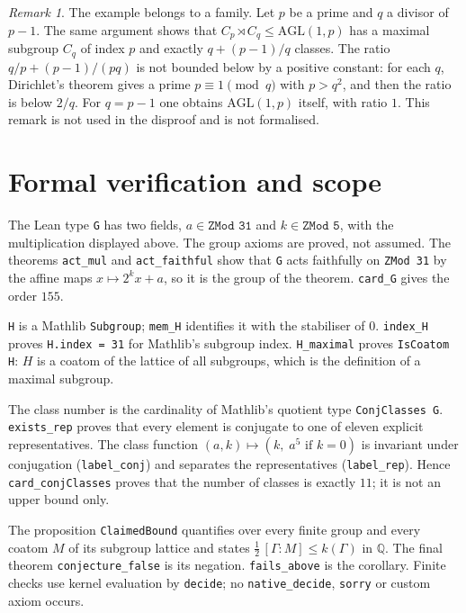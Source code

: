 \documentclass[11pt]{article}
\theoremstyle{remark}
\newtheorem*{remark}{Remark}
\begin{document}
\begin{remark}
The example belongs to a family. Let $p$ be a prime and $q$ a divisor of
$p-1$. The same argument shows that $C_p\rtimes C_q\le
\mathrm{AGL}(1,p)$ has a maximal subgroup $C_q$ of index $p$ and
exactly $q+(p-1)/q$ classes. The ratio $q/p+(p-1)/(pq)$ is not bounded
below by a positive constant: for each $q$, Dirichlet's theorem gives a
prime $p\equiv1\pmod q$ with $p>q^2$, and then the ratio is below $2/q$.
For $q=p-1$ one obtains $\mathrm{AGL}(1,p)$ itself, with ratio $1$. This
remark is not used in the disproof and is not formalised.
\end{remark}

\section*{Formal verification and scope}
The Lean type \texttt{G} has two fields, $a\in\texttt{ZMod 31}$ and
$k\in\texttt{ZMod 5}$, with the multiplication displayed above. The
group axioms are proved, not assumed. The theorems \texttt{act\_mul}
and \texttt{act\_faithful} show that \texttt{G} acts faithfully on
\texttt{ZMod 31} by the affine maps $x\mapsto2^kx+a$, so it is the group
of the theorem. \texttt{card\_G} gives the order $155$.

\texttt{H} is a Mathlib \texttt{Subgroup}; \texttt{mem\_H} identifies
it with the stabiliser of $0$. \texttt{index\_H} proves
\texttt{H.index = 31} for Mathlib's subgroup index. \texttt{H\_maximal}
proves \texttt{IsCoatom H}: $H$ is a coatom of the lattice of all
subgroups, which is the definition of a maximal subgroup.

The class number is the cardinality of Mathlib's quotient type
\texttt{ConjClasses G}. \texttt{exists\_rep} proves that every element
is conjugate to one of eleven explicit representatives. The class
function $(a,k)\mapsto(k,\;a^5\text{ if }k=0)$ is invariant under
conjugation (\texttt{label\_conj}) and separates the representatives
(\texttt{label\_rep}). Hence \texttt{card\_conjClasses} proves that the
number of classes is exactly $11$; it is not an upper bound only.

The proposition \texttt{ClaimedBound} quantifies over every finite group
and every coatom $M$ of its subgroup lattice and states
$\tfrac12\,[\Gamma:M]\le k(\Gamma)$ in $\mathbb Q$. The final theorem
\texttt{conjecture\_false} is its negation. \texttt{fails\_above} is the
corollary. Finite checks use kernel evaluation by \texttt{decide}; no
\texttt{native\_decide}, \texttt{sorry} or custom axiom occurs.
\end{document}
